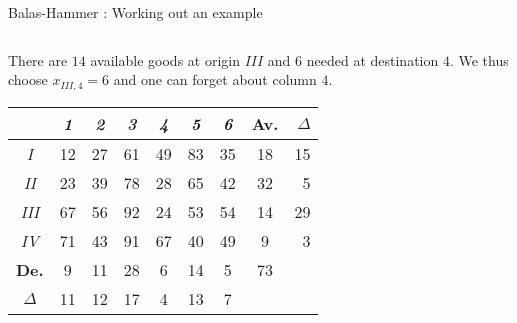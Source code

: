 \documentclass[32pt,aspectratio=169]{beamer}
\begin{document}
\begin{frame}{Balas-Hammer : Working out an example}
  \begin{columns}
    \begin{column}{.6\textwidth}
      There are $14$ available goods at origin $III$ and $6$ needed at
      destination $4$. We thus choose $x_{III,4} = 6$ and one can
      forget about column $4$.

      \begin{overlayarea}{\textwidth}{.5\textheight}      
        \vspace{.45cm}
        \small{
          \begin{tabular}{c|c|c|c|c|c|c|c|r}
            & \textit{1} & \textit{2} & \textit{3} & \textit{4} & \textit{5} & \textit{6} & \cellcolor{blue!50}\textbf{Av.} & \color{blue}$\Delta$\\
            \hline
            \textit{I} & \cellcolor{blue!25}12 & \cellcolor{blue!25}27 & \cellcolor{blue!25}61 & \cellcolor{orange}49 & \cellcolor{blue!25}83 & \cellcolor{blue!25}35 & \cellcolor{blue!50}18 & \color{blue}15 \\
            \hline 
            \textit{II} & \cellcolor{blue!25}23 & \cellcolor{blue!25}39 & \cellcolor{blue!25}78 & \cellcolor{orange}28 & \cellcolor{blue!25}65 & \cellcolor{blue!25}42 & \cellcolor{blue!50}32 & \color{blue}5 \\
            \hline
            \cellcolor{orange}\textit{III} & \cellcolor{orange}67 & \cellcolor{orange}56 & \cellcolor{orange}92 & \cellcolor{orange}24 & \cellcolor{orange}53 & \cellcolor{orange}54 & \cellcolor{blue!50}14 & \cellcolor{orange}\color{blue}29 \\
            \hline
            \textit{IV} & \cellcolor{blue!25}71 & \cellcolor{blue!25}43 & \cellcolor{blue!25}91 & \cellcolor{orange}67 & \cellcolor{blue!25}40 & \cellcolor{blue!25}49 & \cellcolor{blue!50}9 & \color{blue}3 \\
            \hline 
            \cellcolor{blue!50}\textbf{De.} & \cellcolor{blue!50}9 & \cellcolor{blue!50}11 & \cellcolor{blue!50}28 & \cellcolor{blue!50}6 & \cellcolor{blue!50}14 & \cellcolor{blue!50}5 & \cellcolor{blue!60}73 & \\            
            \cline{1-8}
            \color{blue}$\Delta$ & \color{blue}11 & \color{blue}12 & \color{blue}17 & \color{blue}4 & \color{blue}13 & \color{blue}7   
          \end{tabular}
        }
\end{overlayarea}
\end{column}
\end{columns}
\end{frame}
\end{document}
